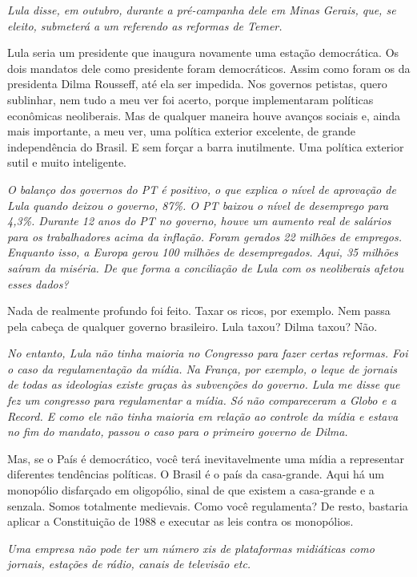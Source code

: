 \itshape
Lula disse, em outubro, durante a pré-campanha dele em
Minas Gerais, que, se eleito, submeterá a um referendo as reformas de
Temer.

\normalfont 
Lula seria um presidente que inaugura novamente uma
estação democrática. Os dois mandatos dele como presidente foram
democráticos. Assim como foram os da presidenta Dilma Rousseff, até ela
ser impedida. Nos governos petistas, quero sublinhar, nem tudo a meu ver
foi acerto, porque implementaram políticas econômicas neoliberais. Mas
de qualquer maneira houve avanços sociais e, ainda mais importante, a
meu ver, uma política exterior excelente, de grande independência do
Brasil. E sem forçar a barra inutilmente. Uma política exterior sutil e
muito inteligente.

\itshape
O balanço dos governos do PT é positivo, o que explica
o nível de aprovação de Lula quando deixou o governo, 87\%. O PT baixou
o nível de desemprego para 4,3\%. Durante 12 anos do PT no governo,
houve um aumento real de salários para os trabalhadores acima da
inflação. Foram gerados 22 milhões de empregos. Enquanto isso, a Europa
gerou 100 milhões de desempregados. Aqui, 35 milhões saíram da miséria.
De que forma a conciliação de Lula com os neoliberais afetou esses
dados?

\normalfont 
Nada de realmente profundo foi feito. Taxar os ricos, por
exemplo. Nem passa pela cabeça de qualquer governo brasileiro. Lula
taxou? Dilma taxou? Não.

\itshape
No entanto, Lula não tinha maioria no Congresso para
fazer certas reformas. Foi o caso da regulamentação da mídia. Na França,
por exemplo, o leque de jornais de todas as ideologias existe graças às
subvenções do governo. Lula me disse que fez um congresso para
regulamentar a mídia. Só não compareceram a Globo e a Record. E como ele
não tinha maioria em relação ao controle da mídia e estava no fim do
mandato, passou o caso para o primeiro governo de Dilma.

\normalfont 
Mas, se o País é democrático, você terá inevitavelmente
uma mídia a representar diferentes tendências políticas. O Brasil é o
país da casa-grande. Aqui há um monopólio disfarçado em oligopólio,
sinal de que existem a casa-grande e a senzala. Somos totalmente
medievais. Como você regulamenta? De resto, bastaria aplicar a
Constituição de 1988 e executar as leis contra os monopólios.

\itshape
Uma empresa não pode ter um número xis de plataformas
midiáticas como jornais, estações de rádio, canais de televisão etc.

